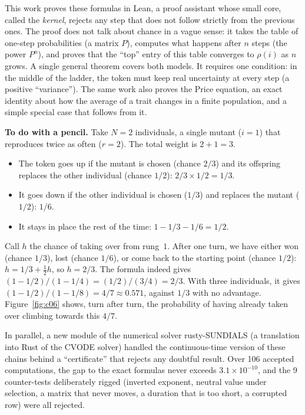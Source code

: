 This work proves these formulas in Lean, a proof assistant whose small core, called the \emph{kernel}, rejects any
step that does not follow strictly from the previous ones. The proof does not talk about chance in a vague sense:
it takes the table of one-step probabilities (a matrix $P$), computes what happens after $n$ steps (the power
$P^n$), and proves that the ``top'' entry of this table converges to $\rho(i)$ as $n$ grows. A single general
theorem covers both models. It requires one condition: in the middle of the ladder, the token must keep real
uncertainty at every step (a positive ``variance''). The same work also proves the Price equation, an exact
identity about how the average of a trait changes in a finite population, and a simple special case that follows
from it.

\begin{encadre}
\textbf{To do with a pencil.} Take $N=2$ individuals, a single mutant ($i=1$) that reproduces twice as often
($r=2$). The total weight is $2+1=3$.
\begin{itemize}
\item The token goes up if the mutant is chosen (chance $2/3$) and its offspring replaces the other individual
  (chance $1/2$): $2/3\times1/2=1/3$.
\item It goes down if the other individual is chosen ($1/3$) and replaces the mutant ($1/2$): $1/6$.
\item It stays in place the rest of the time: $1-1/3-1/6=1/2$.
\end{itemize}
Call $h$ the chance of taking over from rung~$1$. After one turn, we have either won (chance $1/3$), lost (chance
$1/6$), or come back to the starting point (chance $1/2$): $h=1/3+\tfrac12 h$, so $h=2/3$. The formula indeed gives
$(1-1/2)/(1-1/4)=(1/2)/(3/4)=2/3$. With three individuals, it gives $(1-1/2)/(1-1/8)=4/7\approx0.571$, against
$1/3$ with no advantage. Figure~\ref{fig:c06} shows, turn after turn, the probability of having already taken over
climbing towards this $4/7$.
\end{encadre}

In parallel, a new module of the numerical solver rusty-SUNDIALS (a translation into Rust of the CVODE solver)
handled the continuous-time version of these chains behind a ``certificate'' that rejects any doubtful result.
Over 106 accepted computations, the gap to the exact formulas never exceeds $3.1\times10^{-10}$, and the 9
counter-tests deliberately rigged (inverted exponent, neutral value under selection, a matrix that never moves,
a duration that is too short, a corrupted row) were all rejected.

